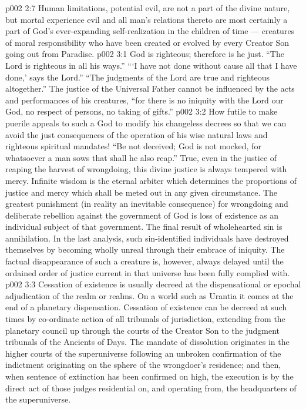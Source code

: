 \vs p002 2:7 Human limitations, potential evil, are not a part of the divine nature, but mortal experience  evil and all man’s relations thereto are most certainly a part of God’s ever\hyp{}expanding self\hyp{}realization in the children of time --- creatures of moral responsibility who have been created or evolved by every Creator Son going out from Paradise.
\vs p002 3:1 God is righteous; therefore is he just. “The Lord is righteous in all his ways.” “‘I have not done without cause all that I have done,’ says the Lord.” “The judgments of the Lord are true and righteous altogether.” The justice of the Universal Father cannot be influenced by the acts and performances of his creatures, “for there is no iniquity with the Lord our God, no respect of persons, no taking of gifts.”
\vs p002 3:2 \pc How futile to make puerile appeals to such a God to modify his changeless decrees so that we can avoid the just consequences of the operation of his wise natural laws and righteous spiritual mandates! “Be not deceived; God is not mocked, for whatsoever a man sows that shall he also reap.” True, even in the justice of reaping the harvest of wrongdoing, this divine justice is always tempered with mercy. Infinite wisdom is the eternal arbiter which determines the proportions of justice and mercy which shall be meted out in any given circumstance. The greatest punishment (in reality an inevitable consequence) for wrongdoing and deliberate rebellion against the government of God is loss of existence as an individual subject of that government. The final result of wholehearted sin is annihilation. In the last analysis, such sin\hyp{}identified individuals have destroyed themselves by becoming wholly unreal through their embrace of iniquity. The factual disappearance of such a creature is, however, always delayed until the ordained order of justice current in that universe has been fully complied with.
\vs p002 3:3 Cessation of existence is usually decreed at the dispensational or epochal adjudication of the realm or realms. On a world such as Urantia it comes at the end of a planetary dispensation. Cessation of existence can be decreed at such times by co\hyp{}ordinate action of all tribunals of jurisdiction, extending from the planetary council up through the courts of the Creator Son to the judgment tribunals of the Ancients of Days. The mandate of dissolution originates in the higher courts of the superuniverse following an unbroken confirmation of the indictment originating on the sphere of the wrongdoer’s residence; and then, when sentence of extinction has been confirmed on high, the execution is by the direct act of those judges residential on, and operating from, the headquarters of the superuniverse.
